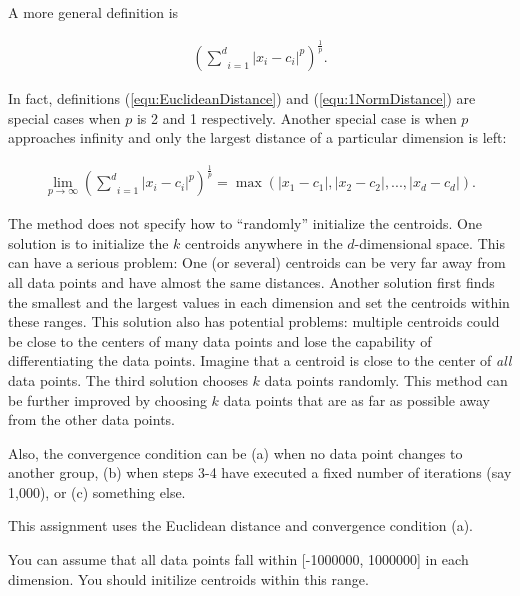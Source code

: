 A more general definition is

\begin{gather}
  (\underset{i=1}{\overset{d}{\sum}} |x_i - c_i| ^ p) ^ {\frac{1}{p}}.
\end{gather}

In fact, definitions (\ref{equ:EuclideanDistance}) and
(\ref{equ:1NormDistance}) are special cases when $p$ is 2 and 1
respectively.  Another special case is when $p$ approaches
infinity and only  the largest distance of a particular
dimension is left:

\begin{gather}
  \underset{p \rightarrow \infty}{\lim}(\underset{i=1}{\overset{d}{\sum}} |x_i - c_i| ^ p) ^ {\frac{1}{p}}
  = \max(|x_1 - c_1|, |x_2 - c_2|, ..., |x_d - c_d|).
\end{gather}

The method does not specify how to ``randomly'' initialize the
centroids. One solution is to initialize the $k$ centroids anywhere in
the $d$-dimensional space.  This can have a serious problem: One (or
several) centroids can be very far away from all data points and have
almost the same distances.  Another solution first finds the smallest
and the largest values in each dimension and set the centroids within
these ranges.  This solution also has potential problems: multiple
centroids could be close to the centers of many data points and lose
the capability of differentiating the data points.  Imagine that a
centroid is close to the center of {\it all} data points.  The third
solution chooses $k$ data points randomly.  This method can be further
improved by choosing $k$ data points that are as far as possible away
from the other data points.






Also, the convergence condition can be (a) when no data
point changes to another group, (b) when steps 3-4 have executed a
fixed number of iterations (say 1,000), or (c) something else.

This assignment uses the Euclidean distance and convergence condition
(a).

You can assume that all data points fall within [-1000000, 1000000] in
   each dimension. You should initilize centroids within this range.

   

